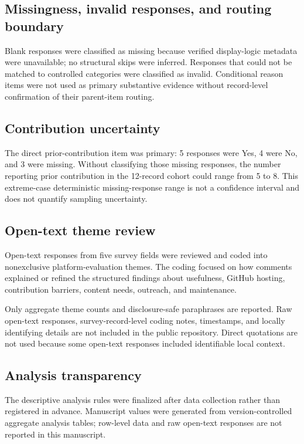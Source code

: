 \documentclass[11pt]{article}
\begin{document}
\subsection{Missingness, invalid responses, and routing boundary}
Blank responses were classified as missing because verified display-logic metadata were unavailable; no structural skips were inferred. Responses that could not be matched to controlled categories were classified as invalid. Conditional reason items were not used as primary substantive evidence without record-level confirmation of their parent-item routing.

\subsection{Contribution uncertainty}
The direct prior-contribution item was primary: 5 responses were Yes, 4 were No, and 3 were missing. Without classifying those missing responses, the number reporting prior contribution in the 12-record cohort could range from 5 to 8. This extreme-case deterministic missing-response range is not a confidence interval and does not quantify sampling uncertainty.

\subsection{Open-text theme review}
Open-text responses from five survey fields were reviewed and coded into nonexclusive platform-evaluation themes. The coding focused on how comments explained or refined the structured findings about usefulness, GitHub hosting, contribution barriers, content needs, outreach, and maintenance.

Only aggregate theme counts and disclosure-safe paraphrases are reported. Raw open-text responses, survey-record-level coding notes, timestamps, and locally identifying details are not included in the public repository. Direct quotations are not used because some open-text responses included identifiable local context.

\subsection{Analysis transparency}
The descriptive analysis rules were finalized after data collection rather than registered in advance. Manuscript values were generated from version-controlled aggregate analysis tables; row-level data and raw open-text responses are not reported in this manuscript.
\end{document}
